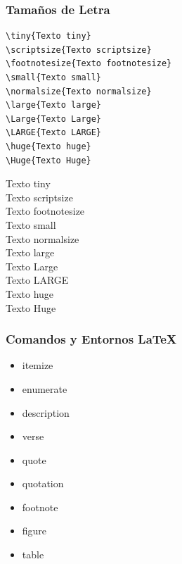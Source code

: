 \documentclass[aspectratio=1610]{beamer}%
\begin{document}
\begin{frame}[fragile]
\frametitle{\textbf{Tamaños de Letra}}
\justifying
 \begin{minipage}[l]{0.55\linewidth}
   \lstset{language=,basicstyle=\small}
   \vspace{-0.7cm}
\begin{lstlisting}
\tiny{Texto tiny}
\scriptsize{Texto scriptsize}
\footnotesize{Texto footnotesize}
\small{Texto small}
\normalsize{Texto normalsize}
\large{Texto large}
\Large{Texto Large}
\LARGE{Texto LARGE}
\huge{Texto huge}
\Huge{Texto Huge}
\end{lstlisting}\vspace{-0.3cm}

\end{minipage}\hfill
\begin{minipage}[r]{0.44\linewidth}\vspace{-0.5cm}
\tiny{Texto tiny}\\\vspace{-0.5cm}
\scriptsize{Texto scriptsize}\\\vspace{-0.5cm}
\footnotesize{Texto footnotesize}\\\vspace{-0.5cm}
\small{Texto small}\\\vspace{-0.5cm}
\normalsize{Texto normalsize}\\\vspace{-0.5cm}
\large{Texto large}\\\vspace{-0.5cm}
\Large{Texto Large}\\\vspace{-0.2cm}
\LARGE{Texto LARGE}\\\vspace{-0.3cm}
\huge{Texto huge}\\\vspace{-0.1cm}
\Huge{Texto Huge}
\end{minipage}

\end{frame}

\begin{frame}[fragile]
\frametitle{\textbf{Comandos y Entornos \LaTeX{}}}
\justifying
 \begin{itemize}\justifying
  \item itemize
  \item enumerate
  \item description
  \item verse
  \item quote
  \item quotation
  \item footnote
  \item figure
  \item table
\end{itemize}

\end{frame}
\end{document}
